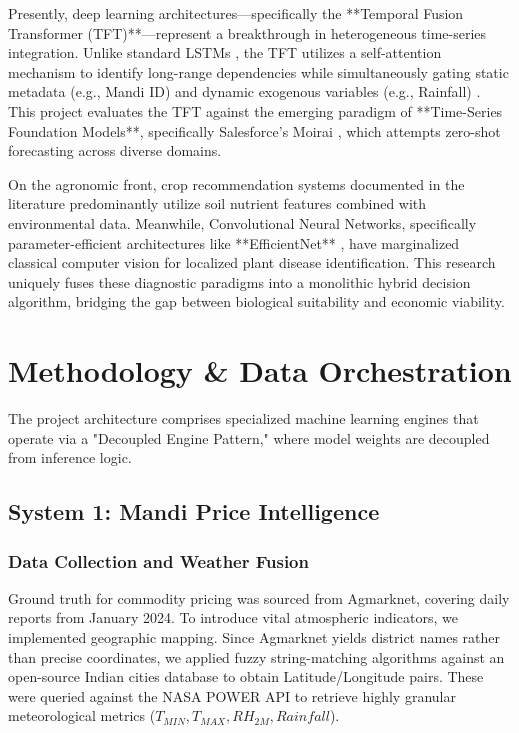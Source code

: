 \documentclass[conference]{IEEEtran}
\begin{document}
Presently, deep learning architectures—specifically the **Temporal Fusion Transformer (TFT)**—represent a breakthrough in heterogeneous time-series integration. Unlike standard LSTMs \cite{hochreiter1997}, the TFT utilizes a self-attention mechanism to identify long-range dependencies while simultaneously gating static metadata (e.g., Mandi ID) and dynamic exogenous variables (e.g., Rainfall) \cite{lim2021tft}. This project evaluates the TFT against the emerging paradigm of **Time-Series Foundation Models**, specifically Salesforce's Moirai \cite{woo2024moirai}, which attempts zero-shot forecasting across diverse domains.

On the agronomic front, crop recommendation systems documented in the literature predominantly utilize soil nutrient features combined with environmental data. Meanwhile, Convolutional Neural Networks, specifically parameter-efficient architectures like **EfficientNet** \cite{tan2019efficientnet}, have marginalized classical computer vision for localized plant disease identification. This research uniquely fuses these diagnostic paradigms into a monolithic hybrid decision algorithm, bridging the gap between biological suitability and economic viability.

\section{Methodology \& Data Orchestration}

The project architecture comprises specialized machine learning engines that operate via a "Decoupled Engine Pattern," where model weights are decoupled from inference logic.

\subsection{System 1: Mandi Price Intelligence}

\subsubsection{Data Collection and Weather Fusion}
Ground truth for commodity pricing was sourced from Agmarknet, covering daily reports from January 2024. To introduce vital atmospheric indicators, we implemented geographic mapping. Since Agmarknet yields district names rather than precise coordinates, we applied fuzzy string-matching algorithms against an open-source Indian cities database to obtain Latitude/Longitude pairs. These were queried against the NASA POWER API to retrieve highly granular meteorological metrics ($T_{MIN}, T_{MAX}, RH_{2M}, Rainfall$).
\end{document}
